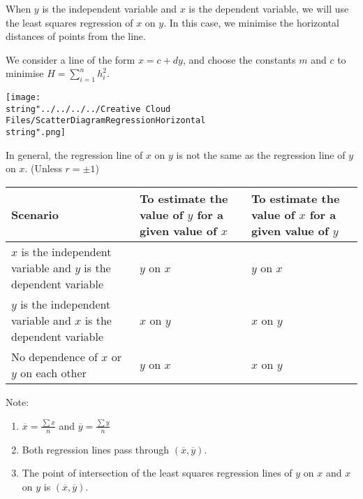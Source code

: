 \documentclass[11pt,a4paper]{book}
\begin{document}
\begin{minipage}[t]{.5\textwidth}

When $y$ is the independent variable and $x$ is the dependent variable,
we will use the least squares regression of $x$ on $y$. In this
case, we minimise the horizontal distances of points from the line.

We consider a line of the form $x=c+dy$, and choose the constants
$m$ and $c$ to minimise ${\displaystyle H=\sum_{i=1}^{n}}h_{i}^{2}$.

\end{minipage}
\begin{minipage}[t]{.5\textwidth}
\begin{center}
\texttt{[image: \\string"../../../../Creative Cloud Files/ScatterDiagramRegressionHorizontal\\string".png]}
\par\end{center}

\end{minipage}

In general, the regression line of $x$ on $y$ is not the same as
the regression line of $y$ on $x$. (Unless $r=\pm1$)
\begin{center}
\setlength{\extrarowheight}{2pt}%
\begin{tabular}{|>{\centering}m{5cm}|>{\centering}m{4cm}|>{\centering}m{4cm}|}
\hline
Scenario & To estimate the value of $y$ for a given value of $x$ & To estimate the value of $x$ for a given value of $y$\tabularnewline
\hline
$x$ is the independent variable and $y$ is the dependent variable & $y$ on $x$ & $y$ on $x$\tabularnewline
\hline
$y$ is the independent variable and $x$ is the dependent variable & $x$ on $y$ & $x$ on $y$\tabularnewline
\hline
No dependence of $x$ or $y$ on each other & $y$ on $x$ & $x$ on $y$\tabularnewline
\hline
\end{tabular}
\par\end{center}

Note:

\begin{enumerate}[label=(\alph*)]

\item  ${\displaystyle \overline{x}=\frac{\sum x}{n}}$ and ${\displaystyle \overline{y}=\frac{\sum y}{n}}$

\item  Both regression lines pass through $\left(\overline{x},\overline{y}\right)$.

\item  The point of intersection of the least squares regression
lines of $y$ on $x$ and $x$ on $y$ is $\left(\overline{x},\overline{y}\right)$.

\end{enumerate}
\end{document}
